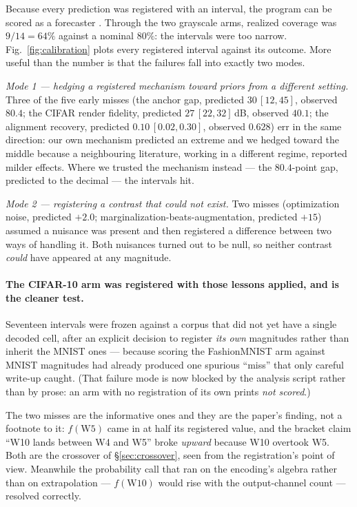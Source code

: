 \documentclass[10pt,twocolumn,letterpaper]{article}
\theoremstyle{definition}
\begin{document}
Because every prediction was registered with an interval, the program can be scored as a
forecaster \citep{gneiting2007scoring}. Through the two grayscale arms, realized coverage was
$9/14 = 64\%$ against a nominal $80\%$: the intervals were too narrow. Fig.~\ref{fig:calibration}
plots every registered interval against its outcome. More useful than the number is that the
failures fall into exactly two modes.

\emph{Mode 1 --- hedging a registered mechanism toward priors from a different setting.} Three of
the five early misses (the anchor gap, predicted $30\,[12,45]$, observed $80.4$; the CIFAR render
fidelity, predicted $27\,[22,32]$\,dB, observed $40.1$; the alignment recovery, predicted
$0.10\,[0.02,0.30]$, observed $0.628$) err in the same direction: our own mechanism predicted an
extreme and we hedged toward the middle because a neighbouring literature, working in a different
regime, reported milder effects. Where we trusted the mechanism instead --- the $80.4$-point gap,
predicted to the decimal --- the intervals hit.

\emph{Mode 2 --- registering a contrast that could not exist.} Two misses (optimization noise,
predicted $+2.0$; marginalization-beats-augmentation, predicted $+15$) assumed a nuisance was
present and then registered a difference between two ways of handling it. Both nuisances turned
out to be null, so neither contrast \emph{could} have appeared at any magnitude.

\paragraph{The CIFAR-10 arm was registered with those lessons applied, and is the cleaner test.}
Seventeen intervals were frozen against a corpus that did not yet have a single decoded cell,
after an explicit decision to register \emph{its own} magnitudes rather than inherit the MNIST
ones --- because scoring the FashionMNIST arm against MNIST magnitudes had already produced one
spurious ``miss'' that only careful write-up caught. (That failure mode is now blocked by the
analysis script rather than by prose: an arm with no registration of its own prints
\emph{not scored}.) 

The two misses are the informative ones and they are the paper's finding, not a footnote to it:
$f(\mathrm{W5})$ came in at half its registered value, and the bracket claim ``W10 lands between
W4 and W5'' broke \emph{upward} because W10 overtook W5. Both are the crossover of
\S\ref{sec:crossover}, seen from the registration's point of view. Meanwhile the probability call
that ran on the encoding's algebra rather than on extrapolation --- $f(\mathrm{W10})$ would rise
with the output-channel count --- resolved correctly.
\end{document}
